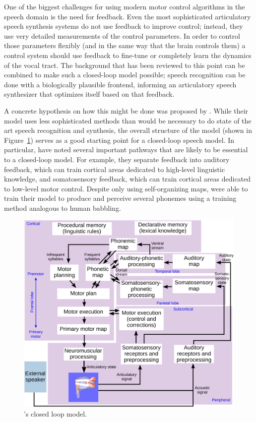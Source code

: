 \documentclass{article}
\begin{document}
One of the biggest challenges
for using modern motor control algorithms
in the speech domain
is the need for feedback.
Even the most sophisticated
articulatory speech synthesis systems
do not use feedback to improve control;
instead, they use very detailed measurements
of the control parameters.
In order to control those parameters flexibly
(and in the same way that the brain controls them)
a control system should use feedback
to fine-tune or completely learn
the dynamics of the vocal tract.
The background that has been reviewed
to this point can be combined
to make such a closed-loop model possible;
speech recognition can be done
with a biologically plausible frontend,
informing an articulatory speech synthesizer
that optimizes itself based on that feedback.

A concrete hypothesis on how
this might be done was proposed by
\citet{kroger2009}.
While their model uses less sophisticated
methods than would be necessary
to do state of the art
speech recognition and synthesis,
the overall structure of the model
(shown in Figure~\ref{fig:kroger})
serves as a good starting point
for a closed-loop speech model.
In particular, \citeauthor{kroger2009} have
noted several important pathways
that are likely to be essential
to a closed-loop model.
For example, they separate feedback
into auditory feedback,
which can train cortical areas
dedicated to high-level linguistic knowledge,
and somatosensory feedback,
which can train cortical areas
dedicated to low-level motor control.
Despite only using self-organizing maps,
\citeauthor{kroger2009} were able to train their model
to produce and perceive several phonemes
using a training method analogous
to human babbling.

\begin{figure}
  \begin{center}
    \includegraphics[width=0.8\linewidth]{kroger}
  \end{center}
  \caption{\citeauthor{kroger2009}'s closed loop model.}
  \label{fig:kroger}
\end{figure}
\end{document}
